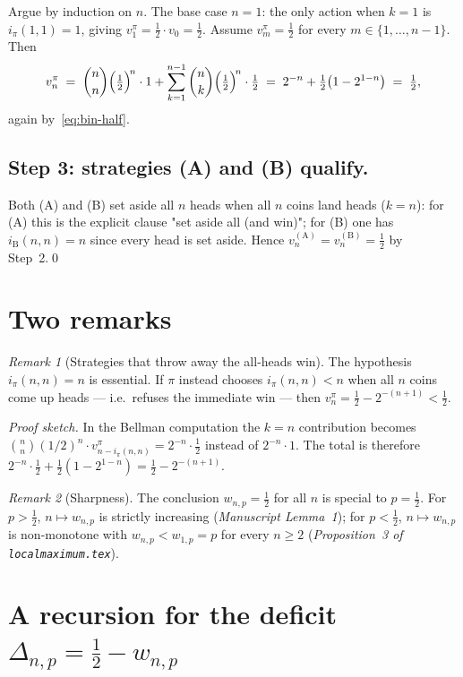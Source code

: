 \documentclass{article}
\theoremstyle{remark}
\newtheorem*{remark}{Remark}
\begin{document}
Argue by induction on $n$. The base case $n=1$: the only action when
$k=1$ is $i_\pi(1,1)=1$, giving $v_1^\pi=\tfrac12\cdot v_0=\tfrac12$.
Assume $v_m^\pi=\tfrac12$ for every $m\in\{1,\dots,n-1\}$. Then
\[
  v_n^\pi
  \;=\;\binom{n}{n}\Bigl(\tfrac12\Bigr)^{\!n}\cdot 1
       +\sum_{k=1}^{n-1}\binom{n}{k}\Bigl(\tfrac12\Bigr)^{\!n}\cdot\tfrac12
  \;=\;2^{-n}+\tfrac12\bigl(1-2^{1-n}\bigr)\;=\;\tfrac12,
\]
again by~\eqref{eq:bin-half}.

\subsection*{Step 3: strategies (A) and (B) qualify.}

Both (A) and (B) set aside all $n$ heads when all $n$ coins land heads
($k=n$): for (A) this is the explicit clause "set aside all (and win)";
for (B) one has $i_\mathrm{B}(n,n)=n$ since every head is set aside.
Hence $v_n^{(\mathrm{A})}=v_n^{(\mathrm{B})}=\tfrac12$ by Step~2.\qed

\section*{Two remarks}

\begin{remark}[Strategies that throw away the all-heads win]
The hypothesis $i_\pi(n,n)=n$ is essential. If $\pi$ instead chooses
$i_\pi(n,n)<n$ when all $n$ coins come up heads — i.e.\ refuses the
immediate win — then $v_n^\pi=\tfrac12-2^{-(n+1)}<\tfrac12$.

\emph{Proof sketch.} In the Bellman computation the $k=n$ contribution
becomes $\binom{n}{n}(1/2)^n\cdot v_{n-i_\pi(n,n)}^\pi=2^{-n}\cdot\tfrac12$
instead of $2^{-n}\cdot 1$. The total is therefore
$2^{-n}\cdot\tfrac12+\tfrac12(1-2^{1-n})=\tfrac12-2^{-(n+1)}$.
\end{remark}

\begin{remark}[Sharpness]
The conclusion $w_{n,p}=\tfrac12$ for all $n$ is special to $p=\tfrac12$.
For $p>\tfrac12$, $n\mapsto w_{n,p}$ is strictly increasing
(\emph{Manuscript Lemma~1}); for $p<\tfrac12$, $n\mapsto w_{n,p}$ is
non-monotone with $w_{n,p}<w_{1,p}=p$ for every $n\ge 2$
(\emph{Proposition~3 of \texttt{localmaximum.tex}}).
\end{remark}

\section*{A recursion for the deficit $\Delta_{n,p}=\tfrac12-w_{n,p}$}
\end{document}

